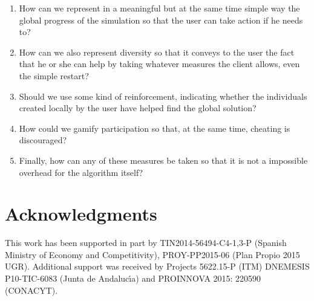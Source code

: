 \documentclass{sig-alternate}
\begin{document}
\begin{enumerate}
\item How can we represent in a meaningful but at the same time simple
  way the global progress of the simulation so that the user can take
  action if he needs to?
\item How can we also represent diversity so that it conveys to the
  user the fact that he or she can help by taking whatever measures
  the client allows, even the simple restart?
\item Should we use some kind of reinforcement, indicating whether the
  individuals created locally by the user have helped find the global solution?
\item How could we gamify participation so that, at the same time,
  cheating is discouraged?
\item Finally, how can any of these measures be taken so that it is
  not a impossible overhead for the algorithm itself?
\end{enumerate}

\section*{Acknowledgments}
 
This work has been supported in part by
TIN2014-56494-C4-{1,3}-P (Spanish Ministry of Economy and Competitivity), PROY-PP2015-06 (Plan Propio 2015 UGR). Additional support was received by
Projects 5622.15-P (ITM) DNEMESIS P10-TIC-6083 (Junta de Andaluc\'{\i}a) and PROINNOVA 2015: 220590 (CONACYT).



\end{document}
